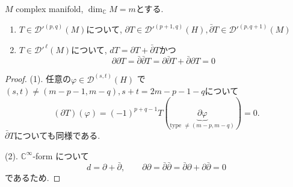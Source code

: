 \begin{tcolorbox}[mybox]
\begin{lem}
\label{lem-M-4.14}
\(M\) complex manifold, \(\dim_{\mathbb{C}}M=m\)とする.
\begin{enumerate}
\item \( T\in \mathcal{D}'^{(p,q)}(M)\)について, 
\( \partial T\in \mathcal{D}'^{(p+1,q)}(H), \bar{\partial}T\in \mathcal{D}'^{(p,q+1)}(M)\)
\item \(T\in \mathcal{D}'^{\,\ell}(M)\)について, 
\(dT=\partial T+\bar{\partial}T\)かつ
\[ \partial\partial T=\bar{\partial}\bar{\partial}T=\partial\bar{\partial}T+\bar{\partial}\partial T=0
\]
\end{enumerate}
\end{lem}
\end{tcolorbox}

\begin{proof}
(1). 
任意の\(\varphi\in \mathcal{D}^{(s,t)}(H)\)
で\((s,t)\neq (m-p-1,m-q), s+t=2m-p-1-q\)について
\[
(\partial T)(\varphi)
=(-1)^{p+q-1}T(\underbrace{\partial \varphi}_{\text{type }\neq (m-p,m-q) })=0.
\]
\(\bar{\partial}T\)についても同様である. 

(2). \(\mathbb{C}^{\infty}\)-form について
\[
d=\partial+\bar{\partial},\qquad \partial\partial=\bar{\partial}\bar{\partial}
=\bar{\partial}\partial+\partial\bar{\partial}=0
\]
であるため. 
\end{proof}


